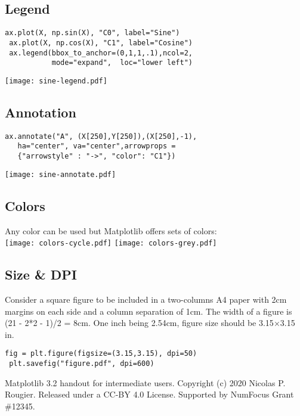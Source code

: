 \documentclass[10pt,landscape,a4paper]{article}
\begin{document}
\begin{multicols*}{3}
\subsection*{\rmfamily Legend}
\begin{lstlisting}[]
 ax.plot(X, np.sin(X), "C0", label="Sine")
 ax.plot(X, np.cos(X), "C1", label="Cosine")
 ax.legend(bbox_to_anchor=(0,1,1,.1),ncol=2,
           mode="expand",  loc="lower left")
\end{lstlisting}
\texttt{[image: sine-legend.pdf]}

\subsection*{\rmfamily Annotation}
\begin{lstlisting}[]
 ax.annotate("A", (X[250],Y[250]),(X[250],-1),
   ha="center", va="center",arrowprops =
   {"arrowstyle" : "->", "color": "C1"})
\end{lstlisting}
\texttt{[image: sine-annotate.pdf]}

\subsection*{\rmfamily Colors}

Any color can be used but Matplotlib offers sets of colors:\\
\texttt{[image: colors-cycle.pdf]} \smallskip
\texttt{[image: colors-grey.pdf]}\\

\subsection*{\rmfamily Size \& DPI}

Consider a square figure to be included in a two-columns A4 paper with
2cm margins on each side and a column separation of 1cm. The width of
a figure is (21 - 2*2 - 1)/2 = 8cm. One inch being 2.54cm, figure size
should be 3.15$\times$3.15 in.
\begin{lstlisting}[]
 fig = plt.figure(figsize=(3.15,3.15), dpi=50)
 plt.savefig("figure.pdf", dpi=600)
\end{lstlisting}


\vfill
%
{\scriptsize Matplotlib 3.2 handout for intermediate users. Copyright
  (c) 2020 Nicolas P. Rougier. Released under a CC-BY 4.0
  License. Supported by NumFocus Grant \#12345.\par}



\end{multicols*}
\end{document}
